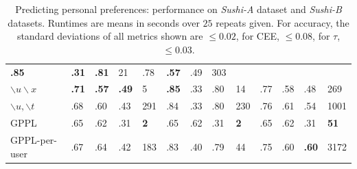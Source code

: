 \begin{table}
\begin{tabularx}{\textwidth}{| p{1.1cm} | X | X | X | p{0.55cm} | X | X | X | p{0.7cm} | X | X | X | p{0.7cm} |}
\textbf{.85} & \textbf{.31} & \textbf{.81} & 21
& .78 &\textbf{.57} & .49 & 303 \\
$\backslash u \backslash x$ & \textbf{.71} & \textbf{.57} & \textbf{.49} & 5 & %
\textbf{.85} & .33 & .80 & 14
& .77 & .58 & .48 & 269
\\
$\backslash u,\backslash t$ %
& .68 & .60 & .43 & 291 %
& .84 & .33 & .80 & 230
& .76 & .61 & .54 & 1001
\\ 
\hline 
GPPL & .65 & .62 & .31 & \textbf{2} %
& .65 & .62 & .31 & \textbf{2}
& .65 & .62 & .31 & \textbf{51}
\\
GPPL-per-user & .67 & .64 & .42 & 183 %
& .83 & .40 & .79 & 44
& .75 & .60 & \textbf{.60} & 3172 %
\\
\hline
\end{tabularx}
\caption{Predicting personal preferences: performance on \emph{Sushi-A} dataset and \emph{Sushi-B} datasets.
Runtimes are means in seconds over $25$ repeats given.
For accuracy, the standard deviations of all metrics shown are $\leq 0.02$, for CEE, $\leq 0.08$, for $\tau$, $\leq 0.03$.
 }
\label{tab:sushi}
\end{table}
